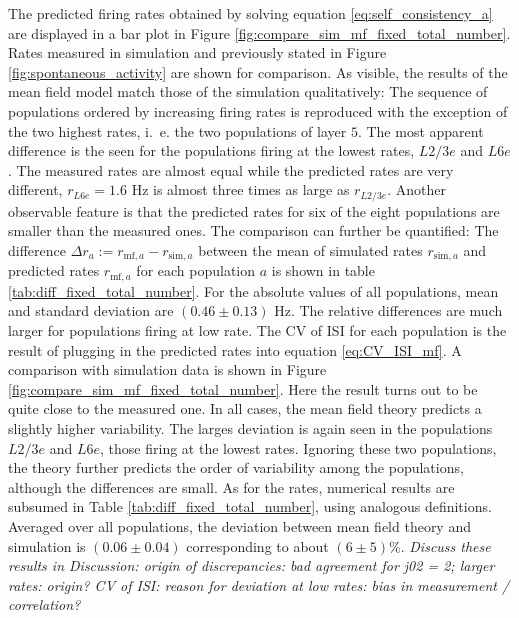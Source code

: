The predicted firing rates obtained by solving equation 
\eqref{eq:self_consistency_a} are displayed in a bar plot in Figure 
\ref{fig:compare_sim_mf_fixed_total_number}. Rates measured in 
simulation and previously stated in Figure \ref{fig:spontaneous_activity}
are shown for comparison. As visible, the results of the mean field model 
match those of the simulation qualitatively: The sequence of populations 
ordered by increasing firing rates is reproduced with the exception of
the two highest rates, i.~e. the two populations of layer $5$. 
The most apparent difference is the seen for the populations firing at the lowest 
rates, $L2/3e$  and $L6e$. The measured rates are almost equal while the 
predicted rates are very different, $r_{L6e} = 1.6$ Hz is almost three times 
as large as $r_{L2/3e}$. Another observable feature is that the predicted rates
for six of the eight populations are smaller than the measured ones. 
The comparison can further be quantified: The difference 
$    \Delta r_a := r_{\text{mf}, a} - r_{\text{sim}, a} $
between the mean of simulated rates $r_{\text{sim}, a}$ and predicted rates 
$r_{\text{mf}, a}$ for each population $a$ is shown in table \ref{tab:diff_fixed_total_number}. 
For the absolute values of all populations, mean and standard 
deviation are $(0.46 \pm  0.13)$ Hz. The relative differences 
are much larger for populations firing at low rate.  
The CV of ISI for each population is the result of plugging in the predicted rates 
into equation \eqref{eq:CV_ISI_mf}. A comparison with simulation data is shown
in Figure \ref{fig:compare_sim_mf_fixed_total_number}. Here the result turns out 
to be quite close to the measured one. In all cases, the mean field theory predicts 
a slightly higher variability. The larges deviation is again seen in the populations 
$L2/3e$ and $L6e$, those firing at the lowest rates. Ignoring these two populations, 
the theory further predicts the order of variability among the populations, although
the differences are small. As for the rates, numerical results are subsumed in 
Table \ref{tab:diff_fixed_total_number}, using analogous definitions. 
Averaged over all populations, the deviation between mean field theory and simulation
is $(0.06 \pm 0.04)$ corresponding to about $(6 \pm 5) \%$. 
\emph{
    Discuss these results in Discussion: origin of discrepancies:
    bad agreement for j02 = 2; larger rates: origin?
    CV of ISI: reason for deviation at low rates: bias in measurement / correlation?
}

